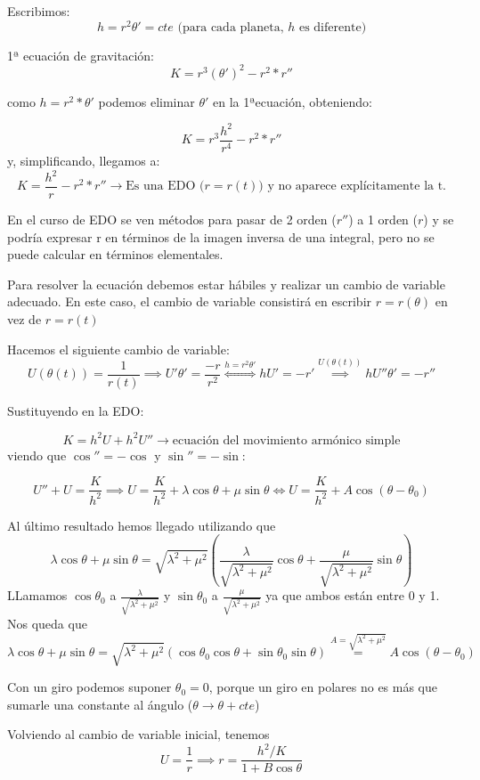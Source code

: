 Escribimos:
\[h= r^2\theta'=cte \text{ (para cada planeta, } h \text{ es diferente)}\]

1ª ecuación de gravitación:
\[K= r^3(\theta')^2 -r^2*r''\]

como $h = r^2*\theta'$ podemos eliminar $\theta'$ en la 1ªecuación, obteniendo:

$$K= r^3 \frac{h^2}{r^4} - r^2*r''$$
y, simplificando, llegamos a:
$$K= \frac{h^2}{r} - r^2*r''  \rightarrow  \text{Es una EDO ($r = r(t)$) y no aparece explícitamente la t.}$$

\obs En el curso de EDO se ven métodos para pasar de 2 orden ($r''$) a 1 orden ($r$) y se podría expresar r en términos de la imagen inversa de una integral, pero no se puede calcular en términos elementales.

Para resolver la ecuación debemos estar hábiles y realizar un cambio de variable adecuado. En este caso, el cambio de variable consistirá en escribir $r=r(\theta)$ en vez de $r=r(t)$

Hacemos el siguiente cambio de variable:
$$U(\theta(t)) = \frac{1}{r(t)} \implies U'\theta' = \frac{-r}{r^2} \stackrel{h=r^2\theta' }{\iff} hU' = -r' \stackrel{U(\theta(t))}{\implies} hU''\theta' = -r''$$

Sustituyendo en la EDO:

$$K= h^2U + h^2U'' \rightarrow \text{ecuación del movimiento armónico simple}$$
viendo que $\cos'' = -\cos$ y $\sin'' = -\sin$:

$$U'' + U = \frac{K}{h^2} \implies U= \frac{K}{h^2} + \lambda\cos\theta + \mu\sin\theta \iff U= \frac{K}{h^2} + A\cos(\theta - \theta_0)$$
\begin{mdframed}
\obs Al último resultado hemos llegado utilizando que
$$ \lambda\cos\theta + \mu\sin\theta = \sqrt{\lambda^2 + \mu^2}\left(\frac{\lambda}{\sqrt{\lambda^2 + \mu^2}}\cos\theta  +\frac{\mu}{ \sqrt{\lambda^2 + \mu^2}}\sin\theta\right)$$
LLamamos $\cos\theta_0$ a $\frac{\lambda}{ \sqrt{\lambda^2 + \mu^2}}$ y $\sin\theta_0$ a $\frac{\mu}{ \sqrt{\lambda^2 + \mu^2}}$ ya que ambos están entre 0 y 1.
Nos queda que
$$\lambda\cos\theta + \mu\sin\theta = \sqrt{\lambda^2 + \mu^2}(\cos\theta_0\cos\theta + \sin\theta_0\sin\theta) \stackrel{A=\sqrt{\lambda^2 + \mu^2}}{=} A\cos(\theta - \theta_0)$$
\end{mdframed}
Con un giro podemos suponer $\theta_0 = 0$, porque un giro en polares no es más que sumarle una constante al ángulo ($\theta \rightarrow \theta + cte$)

Volviendo al cambio de variable inicial, tenemos
\[U = \frac{1}{r} \implies r=\frac{h^2/K}{1 + B\cos\theta}\]

